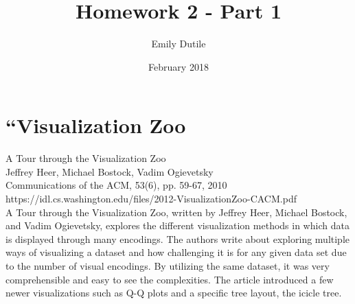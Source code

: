 \documentclass{neu_handout}
\title{Homework 2 - Part 1}
\author{Emily Dutile}
\date{February 2018}
\begin{document}
\section*{“Visualization Zoo}

A Tour through the Visualization Zoo\\
Jeffrey Heer, Michael Bostock, Vadim Ogievetsky\\
Communications of the ACM, 53(6), pp. 59-67, 2010\\
https://idl.cs.washington.edu/files/2012-VisualizationZoo-CACM.pdf\\

A Tour through the Visualization Zoo, written by Jeffrey Heer, Michael Bostock, and Vadim Ogievetsky, explores the different visualization methods in which data is displayed through many encodings. The authors write about exploring multiple ways of visualizing a dataset and how challenging it is for any given data set due to the number of visual encodings. By utilizing the same dataset, it was very comprehensible and easy to see the complexities. The article introduced a few newer visualizations such as Q-Q plots and a specific tree layout, the icicle tree.
\end{document}
